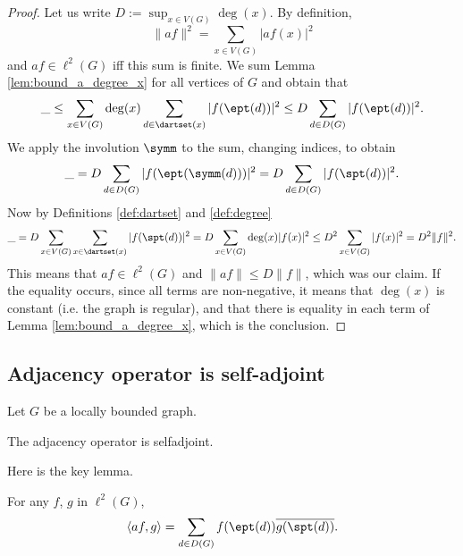 \begin{proof}
Let us write $D := \sup_{x \in V(G)} \deg(x)$.
By definition,
\begin{equation*}
  \|af\|^2
  = \sum_{x \in V(G)} |af(x)|^2
\end{equation*}
and $af \in \ell^2(G)$ iff this sum is finite.
We sum Lemma \ref{lem:bound_a_degree_x} for all vertices of $G$ and obtain that
\begin{equation*}
  \_
  \leq  \sum_{x \in V(G)} \deg(x) \sum_{d \in \dartset(x)} |f(\ept(d))|^2
  \leq D \sum_{d \in D(G)} |f(\ept(d))|^2.
\end{equation*}
We apply the involution $\symm$ to the sum, changing indices, to obtain
\begin{equation*}
  \_
  = D \sum_{d \in D(G)} |f(\ept(\symm(d)))|^2
  = D \sum_{d \in D(G)} |f(\spt(d))|^2.
\end{equation*}
Now by Definitions \ref{def:dartset} and \ref{def:degree}
\begin{equation*}
  \_ = D \sum_{x \in V(G)} \sum_{x \in \dartset(x)} |f(\spt(d))|^2
  = D \sum_{x \in V(G)} \deg(x) |f(x)|^2
\leq D^2 \sum_{x \in V(G)} |f(x)|^2
  = D^2 \|f\|^2.
\end{equation*}
This means that $af \in \ell^2(G)$ and $\|af\| \leq D \|f\|$, which was our claim.
  If the equality occurs, since all terms are non-negative, it means that
  $\deg (x)$ is constant (i.e. the graph is regular), and that there is equality in
  each term of  Lemma \ref{lem:bound_a_degree_x}, which is the conclusion.
\end{proof}

\subsection{Adjacency operator is self-adjoint}

Let $G$ be a locally bounded graph.

\begin{proposition}
  \label{prop:adjacency_is_selfadjoint}
  The adjacency operator is selfadjoint.
\end{proposition}

Here is the key lemma.

\begin{lemma}
  \label{lem:scalar_of_adjacency}
  For any $f$, $g$ in $\ell^2(G)$,
  \begin{equation}
    \langle af, g \rangle
    = \sum_{d \in D(G)}
    f(\ept(d)) \overline{g(\spt(d))}.
  \end{equation}
\end{lemma}

